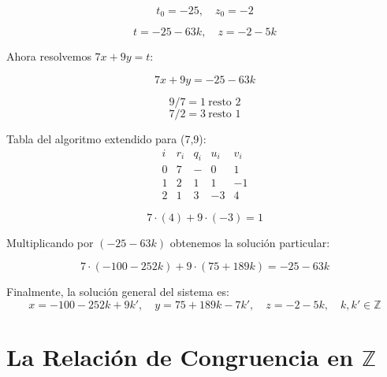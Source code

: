 \documentclass[a4paper,12pt]{article}
\begin{document}
\begin{ejercicio}[title=Ejercicio 9]

\[
t_0 = -25, \quad z_0 = -2
\]

\[
t = -25 - 63k, \quad z = -2 - 5k
\]

\vspace{0.5em}

Ahora resolvemos $7x + 9y = t$:

\[
7x + 9y = -25 - 63k
\]

\[
9 / 7 = 1 \ \text{resto } 2
\]
\[
7 / 2 = 3 \ \text{resto } \boxed{1}
\]

Tabla del algoritmo extendido para (7,9):
\[
\begin{array}{c|c|c|c|c}
i & r_i & q_i & u_i & v_i\\
\hline
0 & 7 & - & 0 & 1\\
1 & 2 & 1 & 1 & -1\\
2 & \boxed{1} & 3 & -3 & 4
\end{array}
\]

\[
7 \cdot (4) + 9 \cdot (-3) = \boxed{1}
\]

Multiplicando por $(-25 - 63k)$ obtenemos la solución particular:

\[
7 \cdot (-100 - 252k) + 9 \cdot (75 + 189k) = -25 - 63k
\]

Finalmente, la solución general del sistema es:
\[
\boxed{
x = -100 - 252k + 9k', \quad y = 75 + 189k - 7k', \quad z = -2 - 5k, \quad k,k' \in \mathbb{Z}
}
\]
    
\end{ejercicio}

\section{La Relación de Congruencia en \(\mathbb{Z}\)}
\end{document}

